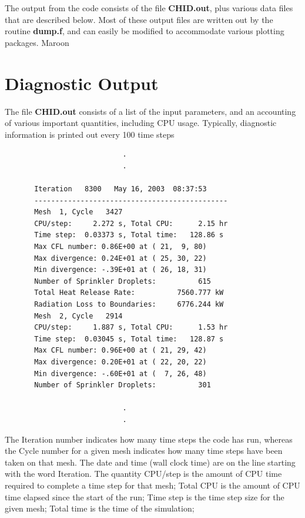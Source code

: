 \documentclass[11pt]{book}
\begin{document}
The output from the code consists of the file {\bf CHID.out}, plus various
data files that are described below.
Most of these output files are written out by the routine {\bf dump.f},
and can easily be modified to accommodate various plotting packages.
Maroon

\section{Diagnostic Output}%

\label{out:file}

The file {\bf CHID.out} consists of a list of the input
parameters, and an accounting of various important quantities, including
CPU usage. Typically, diagnostic information is printed out every
100 time steps

\footnotesize
\begin{verbatim}
                            .
                            .

       Iteration   8300   May 16, 2003  08:37:53
       ----------------------------------------------
       Mesh  1, Cycle   3427
       CPU/step:     2.272 s, Total CPU:      2.15 hr
       Time step:  0.03373 s, Total time:   128.86 s
       Max CFL number: 0.86E+00 at ( 21,  9, 80)
       Max divergence: 0.24E+01 at ( 25, 30, 22)
       Min divergence: -.39E+01 at ( 26, 18, 31)
       Number of Sprinkler Droplets:          615
       Total Heat Release Rate:          7560.777 kW
       Radiation Loss to Boundaries:     6776.244 kW
       Mesh  2, Cycle   2914
       CPU/step:     1.887 s, Total CPU:      1.53 hr
       Time step:  0.03045 s, Total time:   128.87 s
       Max CFL number: 0.96E+00 at ( 21, 29, 42)
       Max divergence: 0.20E+01 at ( 22, 20, 22)
       Min divergence: -.60E+01 at (  7, 26, 48)
       Number of Sprinkler Droplets:          301

                            .
                            .
\end{verbatim}
\normalsize
The Iteration number indicates how many time steps the code has run, whereas the
Cycle number for a given mesh indicates how many time steps have been taken on that
mesh. The date and time (wall clock time) are on the line starting with the word
Iteration. The quantity {\ct CPU/step} is the amount of CPU time required to complete
a time step for that mesh; {\ct Total CPU} is the amount of CPU time elapsed since the
start of the run; {\ct Time step} is the time step size for the given mesh;
{\ct Total time} is the time of the simulation;
\end{document}
